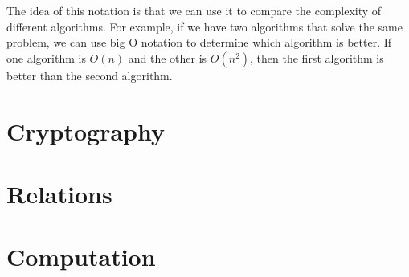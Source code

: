 \documentclass[11pt]{article}
\begin{document}
The idea of this notation is that we can use it to compare the complexity of different algorithms. For example, if we have two algorithms that solve the same problem, we can use big O notation to determine which algorithm is better. If one algorithm is \(O(n)\) and the other is \(O(n^2)\), then the first algorithm is better than the second algorithm.



\section{Cryptography}
\label{sec:orgd0e6d55}

\section{Relations}
\label{sec:org6790652}

\section{Computation}
\label{sec:orgf589139}
\end{document}
